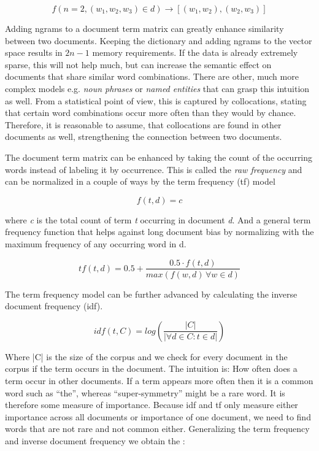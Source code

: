       \begin{equation}
        f(n = 2, (w_1, w_2, w_3) \in d) \to [(w_1, w_2),(w_2,w_3)]
      \end{equation}

    Adding ngrams to a document term matrix can greatly enhance similarity between two documents. Keeping the dictionary and adding ngrams to the vector space results in $2n-1$ memory requirements. If the data is already extremely sparse, this will not help much, but can increase the semantic effect on documents that share similar word combinations. There are other, much more complex models e.g. \emph{noun phrases} or \emph{named entities} that can grasp this intuition as well. From a statistical point of view, this is captured by collocations, stating that certain word combinations occur more often than they would by chance. Therefore, it is reasonable to assume, that collocations are found in other documents as well, strengthening the connection between two documents.

    The document term matrix can be enhanced by taking the count of the occurring words instead of labeling it by occurrence. This is called the \emph{raw frequency} and can be normalized in a couple of ways by the term frequency (tf) model
     
      \begin{equation}
        f(t,d) = c
      \end{equation}

    where \emph{c} is the total count of term \emph{t} occurring in document \emph{d}.
    And a general term frequency function that helps against long document bias by normalizing with the maximum frequency of any occurring word in d.

    \begin{equation}
      tf(t,d) = 0.5 + \frac{0.5 \cdot f(t,d)}{max(f(w,d)\, \forall w \in d)}
    \end{equation}

    The term frequency model can be further advanced by calculating the inverse document frequency (idf).

    \begin{equation}
      idf(t, C) = log(\frac{|C|}{|\forall d \in C : t \in d|})
    \end{equation}

    Where |C| is the size of the corpus and we check for every document in the corpus if the term occurs in the document. The intuition is: How often does a term occur in other documents. If a term appears more often then it is a common word such as ``the'', whereas ``super-symmetry'' might be a rare word. It is therefore some measure of importance. Because idf and tf only measure either importance across all documents or importance of one document, we need to find words that are not rare and not common either. Generalizing the term frequency and inverse document frequency we obtain the \tfidf{}:

